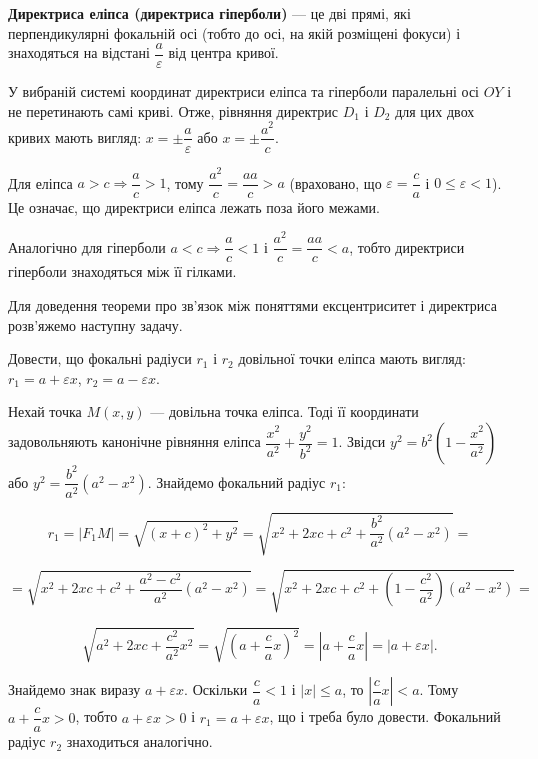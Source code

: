 \begin{definition}
	\textbf{Директриса еліпса (директриса гіперболи)} --- це дві прямі, які
	перпендикулярні фокальній осі (тобто до осі, на якій розміщені фокуси) і
	знаходяться на відстані $\dfrac{a}{\varepsilon}$ від центра кривої.
\end{definition}

У вибраній системі координат директриси еліпса та гіперболи паралельні осі
$OY$ і не перетинають самі криві. Отже, рівняння директрис $D_1$ і $D_2$ для цих двох
кривих мають вигляд: $x = \pm\dfrac{a}{\varepsilon}$ або $x = \pm\dfrac{a^2}{c}$.

Для еліпса $a > c \Rightarrow \dfrac{a}{c} > 1$, тому $\dfrac{a^2}{c} = \dfrac{aa}{c} > a$
(враховано, що $\varepsilon = \dfrac{c}{a}$ і $0 \leqslant \varepsilon < 1$). Це
означає, що директриси еліпса лежать поза його межами.

Аналогічно для гіперболи $a < c \Rightarrow \dfrac{a}{c} < 1$ і $\dfrac{a^2}{c} = \dfrac{aa}{c} < a$,
тобто директриси гіперболи знаходяться між її гілками.

Для доведення теореми про зв’язок між поняттями ексцентриситет і
директриса розв’яжемо наступну задачу.

\begin{problem}
	Довести, що фокальні радіуси $r_1$ і $r_2$ довільної точки еліпса мають
	вигляд: $r_1 = a + \varepsilon x$, $r_2 = a - \varepsilon x$. 
\end{problem}
\begin{solution}
	Нехай точка $M(x,y)$ --- довільна точка еліпса. Тоді її координати
	задовольняють канонічне рівняння еліпса $\dfrac{x^2}{a^2} + \dfrac{y^2}{b^2} = 1$. Звідси $y^2 = b^2(1-\dfrac{x^2}{a^2})$
	або $y^2 = \dfrac{b^2}{a^2}(a^2-x^2)$. Знайдемо фокальний радіус $r_1$:

	$$r_1 = |F_1M| = \sqrt{(x+c)^2 + y^2} = \sqrt{x^2 + 2xc + c^2 + \dfrac{b^2}{a^2}(a^2-x^2)} =$$

	$$= \sqrt{x^2 + 2xc + c^2 + \dfrac{a^2-c^2}{a^2}(a^2-x^2)} = \sqrt{x^2 + 2xc + c^2 + (1-\dfrac{c^2}{a^2})(a^2-x^2)} =$$

	$$\sqrt{a^2 + 2xc + \dfrac{c^2}{a^2}x^2} = \sqrt{(a + \dfrac{c}{a}x)^2} = |a + \dfrac{c}{a}x| = |a + \varepsilon x|.$$

	Знайдемо знак виразу $a + \varepsilon x$. Оскільки $\dfrac{c}{a} < 1$ і $|x| \leqslant a$, то $|\dfrac{c}{a}x| < a$.
	Тому $a + \dfrac{c}{a}x > 0$, тобто $a + \varepsilon x > 0$ і $r_1 = a + \varepsilon x$, що і треба було довести. Фокальний
	радіус $r_2$ знаходиться аналогічно.
\end{solution}

